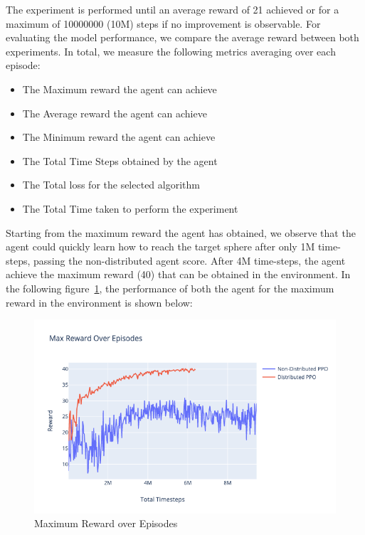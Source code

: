 The experiment is performed until an average reward of 21 achieved or for a maximum of 10000000 (10M) steps if no improvement is observable. For evaluating the model performance, we compare the average reward between both experiments. In total, we measure the following metrics averaging over each episode:
\begin{itemize}
		\item The Maximum reward the agent can achieve
		\item The Average reward the agent can achieve
		\item The Minimum reward the agent can achieve
		\item The Total Time Steps obtained by the agent
		\item The Total loss for the selected algorithm
		\item The Total Time taken to perform the experiment
\end{itemize}

Starting from the maximum reward the agent has obtained, we observe that the agent could quickly learn how to reach the target sphere after only 1M time-steps, passing the non-distributed agent score. After 4M time-steps, the agent achieve the maximum reward (40) that can be obtained in the environment. In the following figure~\ref{fig:2nd_exp_max_eps_reward}, the performance of both the agent for the maximum reward in the environment is shown below:
\begin{figure}[!htb]
		\centering
		\includegraphics[width=\linewidth]{figures/exps/2nd_exp/max_eps_reward.png}
		\caption{Maximum Reward over Episodes}
		\label{fig:2nd_exp_max_eps_reward}
\end{figure}

